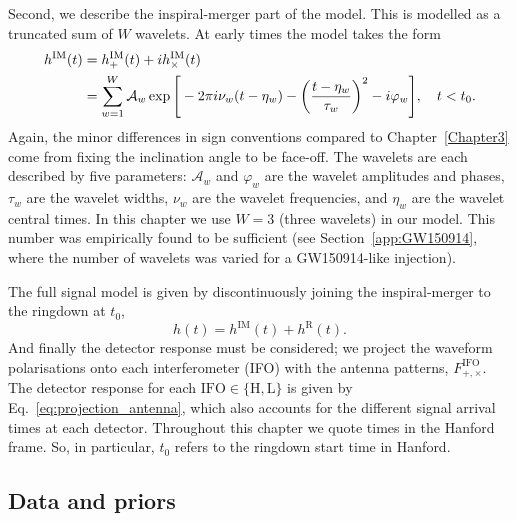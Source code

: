 Second, we describe the inspiral-merger part of the model.
This is modelled as a truncated sum of $W$ wavelets.
At early times the model takes the form
\begin{align}\label{eq:wavelets}
	h^\mathrm{IM}(t) &=  h_+^\mathrm{IM}(t) + ih_\times^\mathrm{IM}(t) \nonumber \\
	&= \sum_{w=1}^{W} \mathcal{A}_w \exp \Bigg[-2\pi i \nu_w(t-\eta_w) - \qty(\frac{t-\eta_w}{\tau_w})^2 - i\varphi_w \Bigg], \quad t < t_0. 
\end{align}
Again, the minor differences in sign conventions compared to Chapter~\ref{Chapter3} come from fixing the inclination angle to be face-off. 
The wavelets are each described by five parameters: $\mathcal{A}_w$ and $\varphi_w$ are the wavelet amplitudes and phases, $\tau_w$ are the wavelet widths, $\nu_w$ are the wavelet frequencies, and $\eta_w$ are the wavelet central times. 
In this chapter we use $W=3$ (three wavelets) in our model.
This number was empirically found to be sufficient (see Section~\ref{app:GW150914}, where the number of wavelets was varied for a GW150914-like injection).

The full signal model is given by discontinuously joining the inspiral-merger to the ringdown at $t_0$,
\begin{equation}
	h(t) = h^\mathrm{IM}(t) + h^\mathrm{R}(t).
\end{equation}
And finally the detector response must be considered; we project the waveform polarisations onto each interferometer (IFO) with the antenna patterns, $F^\mathrm{IFO}_{+,\times}$.
The detector response for each ${\mathrm{IFO}\in \{\mathrm{H}, \mathrm{L}\}}$ is given by Eq.~\ref{eq:projection_antenna}, which also accounts for the different signal arrival times at each detector.
Throughout this chapter we quote times in the Hanford frame.
So, in particular, $t_0$ refers to the ringdown start time in Hanford.


\subsection{Data and priors}
\label{sec:details}

